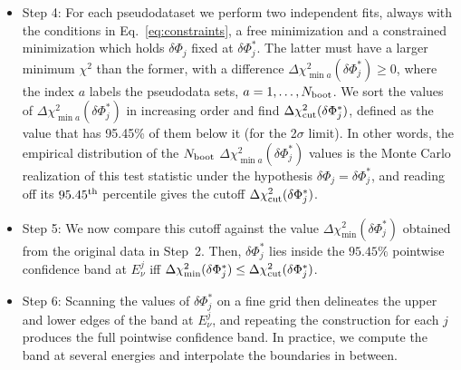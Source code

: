 \documentclass[a4paper,11pt]{article}
\renewcommand\({\left(}
\renewcommand\){\right)}
\renewcommand\[{\left[}
\renewcommand\]{\right]}
\theoremstyle{definition}
\begin{document}
\begin{itemize}
{We set $N_{\rm boot} = 500$, for which our determination of the 2$\sigma$ bands has a 1\% error. Each pseudo-experiment has a chance to fall within the desired confidence level, described by a binomial distribution with the ``success probability'' $p=X/N$, where $X$ is the number of successes and $N$ is the total number of trials. For large $N$, and $p$ not very close to 0 or 1, $p$ is Gaussian distributed.
The standard deviation of $p$ is $\sigma_p=\sqrt{p(1-p)/N}$, and in our case  $N= N_{\rm boot}$. To achieve a certain $\sigma_p$, the number of trials needed is $N=p(1-p)/\sigma_p^2$. With $N_{\rm boot}=500$ we have $\sigma_p=0.021$ for $p=0.68$ (1$\sigma$) and $\sigma_p=0.010$ for $p=0.95$ (2$\sigma$).}

\item{Step 4: For each pseudodataset we perform two independent fits, always with the conditions in Eq.~\eqref{eq:constraints},  a free minimization  and a constrained minimization which holds $\delta\Phi_j$ fixed at $\delta\Phi_j^*$. The latter must have a larger minimum $\chi^2$ than the former, with a difference $\Delta\chi^2_{\min a}(\delta\Phi_j^*)\ge 0$, where the index $a$ labels the pseudodata sets, $a= 1, \ldots, N_{\rm boot}$.
We sort the values of $\Delta\chi^2_{\min a}(\delta\Phi_j^*)$ in increasing order and find 
$\Delta\chi^2_{\rm cut}(\delta\Phi_j^*)$, defined as the value that has  
95.45\% of them below it (for the 2$\sigma$ limit). 
In other words, the empirical distribution of the $N_{\rm boot}$ $\Delta\chi^2_{\min a}(\delta\Phi_j^*)$ values is the Monte Carlo realization of this test statistic under the hypothesis $\delta\Phi_j = \delta\Phi_j^*$, and reading off its $95.45^{\rm th}$ percentile gives the cutoff $\Delta\chi^2_{\rm cut}(\delta\Phi_j^*)$. }

\item{Step 5: We now compare this cutoff against the value $\Delta\chi^2_{\min}(\delta\Phi_j^*)$
obtained from the original data in Step~2. Then,  $\delta\Phi_j^*$ lies inside the $95.45\%$ pointwise confidence band at $E_\nu^j$ iff $\Delta\chi^2_{\min}(\delta\Phi_j^*) \leq \Delta\chi^2_{\rm cut}(\delta\Phi_j^*)$.}

 \item{Step 6: Scanning the values of $\delta\Phi_j^*$ on a fine grid then delineates the upper and lower edges of the band at $E_\nu^j$, and repeating the construction for each $j$ produces the full pointwise confidence band. In practice, we compute the band at several energies and interpolate the boundaries in between.}

\end{itemize}
\end{document}
